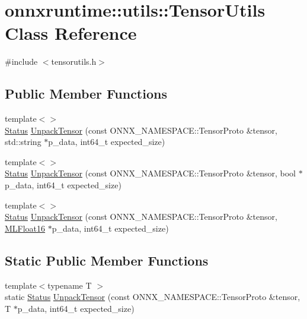 \hypertarget{classonnxruntime_1_1utils_1_1TensorUtils}{}\section{onnxruntime\+:\+:utils\+:\+:Tensor\+Utils Class Reference}
\label{classonnxruntime_1_1utils_1_1TensorUtils}


{\ttfamily \#include $<$tensorutils.\+h$>$}

\subsection*{Public Member Functions}
\begin{DoxyCompactItemize}
\item 
{\footnotesize template$<$$>$ }\\\mbox{\hyperlink{classonnxruntime_1_1common_1_1Status}{Status}} \mbox{\hyperlink{classonnxruntime_1_1utils_1_1TensorUtils_a86c0b1961239a5198acd3955ddf83869}{Unpack\+Tensor}} (const O\+N\+N\+X\+\_\+\+N\+A\+M\+E\+S\+P\+A\+C\+E\+::\+Tensor\+Proto \&tensor, std\+::string $\ast$p\+\_\+data, int64\+\_\+t expected\+\_\+size)
\item 
{\footnotesize template$<$$>$ }\\\mbox{\hyperlink{classonnxruntime_1_1common_1_1Status}{Status}} \mbox{\hyperlink{classonnxruntime_1_1utils_1_1TensorUtils_aa9ccd0bd8be029bc52c4778ecb2e533c}{Unpack\+Tensor}} (const O\+N\+N\+X\+\_\+\+N\+A\+M\+E\+S\+P\+A\+C\+E\+::\+Tensor\+Proto \&tensor, bool $\ast$p\+\_\+data, int64\+\_\+t expected\+\_\+size)
\item 
{\footnotesize template$<$$>$ }\\\mbox{\hyperlink{classonnxruntime_1_1common_1_1Status}{Status}} \mbox{\hyperlink{classonnxruntime_1_1utils_1_1TensorUtils_a3466d3aa84eca1738527b3d2c66ab7ae}{Unpack\+Tensor}} (const O\+N\+N\+X\+\_\+\+N\+A\+M\+E\+S\+P\+A\+C\+E\+::\+Tensor\+Proto \&tensor, \mbox{\hyperlink{uniononnxruntime_1_1MLFloat16}{M\+L\+Float16}} $\ast$p\+\_\+data, int64\+\_\+t expected\+\_\+size)
\end{DoxyCompactItemize}
\subsection*{Static Public Member Functions}
\begin{DoxyCompactItemize}
\item 
{\footnotesize template$<$typename T $>$ }\\static \mbox{\hyperlink{classonnxruntime_1_1common_1_1Status}{Status}} \mbox{\hyperlink{classonnxruntime_1_1utils_1_1TensorUtils_a2fb568cfbc282c4732a08059bea19a6f}{Unpack\+Tensor}} (const O\+N\+N\+X\+\_\+\+N\+A\+M\+E\+S\+P\+A\+C\+E\+::\+Tensor\+Proto \&tensor, T $\ast$p\+\_\+data, int64\+\_\+t expected\+\_\+size)
\end{DoxyCompactItemize}


